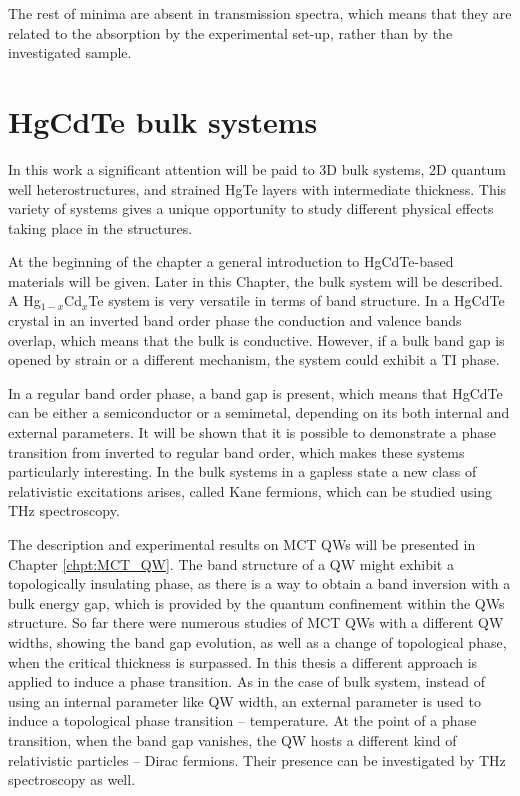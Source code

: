 \documentclass[titlepage,a4paper]{book}
\newcommand{\wciecie}{\quad\phantom{v}}
\begin{document}
The rest of minima are absent in transmission spectra, which means that they are related to the absorption by the experimental set-up, rather than by the investigated sample.


\chapter{HgCdTe bulk systems}
\label{chpt:HgCdTe bulk systems}
\wciecie
In this work a significant attention will be paid to 3D bulk systems, 2D quantum well heterostructures, and strained HgTe layers with intermediate thickness. This variety of systems gives a unique opportunity to study different physical effects taking place in the structures. 

At the beginning of the chapter a general introduction to HgCdTe-based materials will be given. Later in this Chapter, the bulk system will be described. A Hg$_{1-x}$Cd$_x$Te system is very versatile in terms of band structure. In a HgCdTe crystal in an inverted band order phase the conduction and valence bands overlap, which means that the bulk is conductive. However, if a bulk band gap is opened by strain or a different mechanism, the system could exhibit a TI phase. 

In a regular band order phase, a band gap is present, which means that HgCdTe can be either a semiconductor or a semimetal, depending on its both internal and external parameters. It will be shown that it is possible to demonstrate a phase transition from inverted to regular band order, which makes these systems particularly interesting. In the bulk systems in a gapless state a new class of relativistic excitations arises, called Kane fermions, which can be studied using THz spectroscopy.

The description and experimental results on MCT QWs will be presented in Chapter \ref{chpt:MCT_QW}. The band structure of a QW might exhibit a topologically insulating phase, as there is a way to obtain a band inversion with a bulk energy gap, which is provided by the quantum confinement within the QWs structure. So far there were numerous studies of MCT QWs with a different QW widths, showing the band gap evolution, as well as a change of topological phase, when the critical thickness is surpassed. In this thesis a different approach is applied to induce a phase transition. As in the case of bulk system, instead of using an internal parameter like QW width, an external parameter is used to induce a topological phase transition -- temperature. At the point of a phase transition, when the band gap vanishes, the QW hosts a different kind of relativistic particles -- Dirac fermions. Their presence can be investigated by THz spectroscopy as well. 
\end{document}
